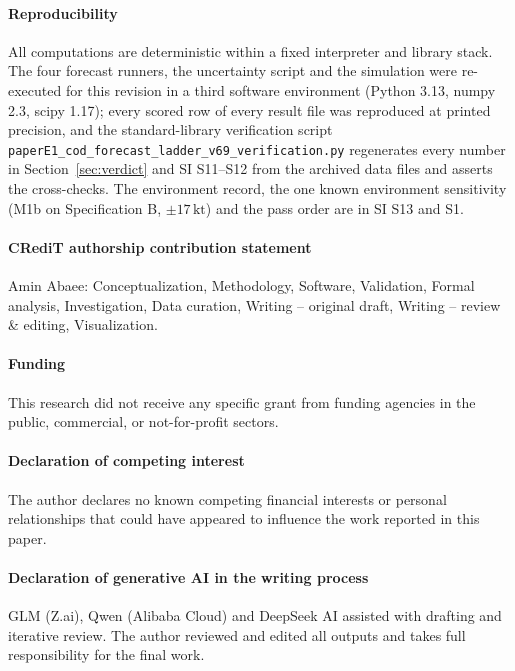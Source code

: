 \documentclass[preprint,11pt,authoryear]{elsarticle}
\theoremstyle{definition}
\theoremstyle{remark}
\newcommand{\kt}{\,\mathrm{kt}}
\begin{document}
\paragraph{Reproducibility} All computations are deterministic within a fixed interpreter and library stack. The four forecast runners, the uncertainty script and the simulation were re-executed for this revision in a third software environment (Python 3.13, numpy 2.3, scipy 1.17); every scored row of every result file was reproduced at printed precision, and the standard-library verification script \texttt{paperE1\_cod\_forecast\_ladder\_v69\_verification.py} regenerates every number in Section~\ref{sec:verdict} and SI S11--S12 from the archived data files and asserts the cross-checks. The environment record, the one known environment sensitivity (M1b on Specification B, $\pm17\kt$) and the pass order are in SI S13 and S1.

\paragraph{CRediT authorship contribution statement} Amin Abaee: Conceptualization, Methodology, Software, Validation, Formal analysis, Investigation, Data curation, Writing -- original draft, Writing -- review \& editing, Visualization.

\paragraph{Funding} This research did not receive any specific grant from funding agencies in the public, commercial, or not-for-profit sectors.

\paragraph{Declaration of competing interest} The author declares no known competing financial interests or personal relationships that could have appeared to influence the work reported in this paper.

\paragraph{Declaration of generative AI in the writing process} GLM (Z.ai), Qwen (Alibaba Cloud) and DeepSeek AI assisted with drafting and iterative review. The author reviewed and edited all outputs and takes full responsibility for the final work.
\end{document}
